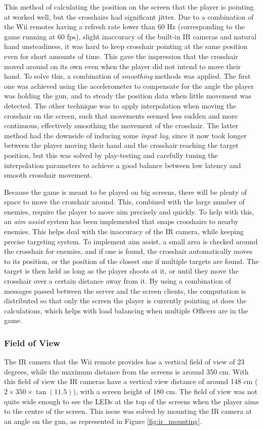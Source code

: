\documentclass[a4paper,11pt]{article}
\begin{document}
This method of calculating the position on the screen that the player is pointing at worked well, but the crosshairs had significant jitter. Due to a combination of the Wii remotes having a refresh rate lower than 60 Hz (corresponding to the game running at 60 fps), slight inaccuracy of the built-in IR cameras and natural hand unsteadiness, it was hard to keep crosshair pointing at the same position even for short amounts of time. This gave the impression that the crosshair moved around on its own even when the player did not intend to move their hand. To solve this, a combination of \emph{smoothing} methods was applied. The first one was achieved using the accelerometer to compensate for the angle the player was holding the gun, and to steady the position data when little movement was detected. The other technique was to apply interpolation when moving the crosshair on the screen, such that movements seemed less sudden and more continuous, effectively smoothing the movement of the crosshair. The latter method had the downside of inducing some \emph{input lag}, since it now took longer between the player moving their hand and the crosshair reaching the target position, but this was solved by play-testing and carefully tuning the interpolation parameters to achieve a good balance between low latency and smooth crosshair movement.

Because the game is meant to be played on big screens, there will be plenty of space to move the crosshair around. This, combined with the large number of enemies, require the player to move aim precisely and quickly. To help with this, an \emph{aim assist} system has been implemented that snaps crosshairs to nearby enemies. This helps deal with the inaccuracy of the IR camera, while keeping precise targeting system. To implement aim assist, a small area is checked around the crosshair for enemies, and if one is found, the crosshair automatically moves to its position, or the position of the closest one if multiple targets are found. The target is then held as long as the player shoots at it, or until they move the crosshair over a certain distance away from it. By using a combination of messages passed between the server and the screen clients, the computation is distributed so that only the screen the player is currently pointing at does the calculations, which helps with load balancing when multiple Officers are in the game.

\subsubsection{Field of View}
The IR camera that the Wii remote provides has a vertical field of view of 23 degrees, while the maximum distance from the screens is around 350 cm. With this field of view the IR cameras have a vertical view distance of around 148 cm ($2 \times 350 \times \tan(11.5)$), with a screen height of 180 cm. The field of view was not quite wide enough to see the LEDs at the top of the screens when the player aims to the centre of the screen. This issue was solved by mounting the IR camera at an angle on the gun, as represented in Figure \ref{fig:ir_mounting}.
\end{document}
